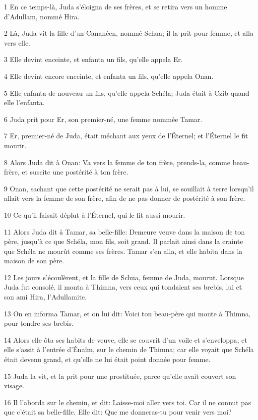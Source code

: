 \par 1 En ce temps-là, Juda s'éloigna de ses frères, et se retira vers un homme d'Adullam, nommé Hira.
\par 2 Là, Juda vit la fille d'un Cananéen, nommé Schua; il la prit pour femme, et alla vers elle.
\par 3 Elle devint enceinte, et enfanta un fils, qu'elle appela Er.
\par 4 Elle devint encore enceinte, et enfanta un fils, qu'elle appela Onan.
\par 5 Elle enfanta de nouveau un fils, qu'elle appela Schéla; Juda était à Czib quand elle l'enfanta.
\par 6 Juda prit pour Er, son premier-né, une femme nommée Tamar.
\par 7 Er, premier-né de Juda, était méchant aux yeux de l'Éternel; et l'Éternel le fit mourir.
\par 8 Alors Juda dit à Onan: Va vers la femme de ton frère, prends-la, comme beau-frère, et suscite une postérité à ton frère.
\par 9 Onan, sachant que cette postérité ne serait pas à lui, se souillait à terre lorsqu'il allait vers la femme de son frère, afin de ne pas donner de postérité à son frère.
\par 10 Ce qu'il faisait déplut à l'Éternel, qui le fit aussi mourir.
\par 11 Alors Juda dit à Tamar, sa belle-fille: Demeure veuve dans la maison de ton père, jusqu'à ce que Schéla, mon fils, soit grand. Il parlait ainsi dans la crainte que Schéla ne mourût comme ses frères. Tamar s'en alla, et elle habita dans la maison de son père.
\par 12 Les jours s'écoulèrent, et la fille de Schua, femme de Juda, mourut. Lorsque Juda fut consolé, il monta à Thimna, vers ceux qui tondaient ses brebis, lui et son ami Hira, l'Adullamite.
\par 13 On en informa Tamar, et on lui dit: Voici ton beau-père qui monte à Thimna, pour tondre ses brebis.
\par 14 Alors elle ôta ses habits de veuve, elle se couvrit d'un voile et s'enveloppa, et elle s'assit à l'entrée d'Énaïm, sur le chemin de Thimna; car elle voyait que Schéla était devenu grand, et qu'elle ne lui était point donnée pour femme.
\par 15 Juda la vit, et la prit pour une prostituée, parce qu'elle avait couvert son visage.
\par 16 Il l'aborda sur le chemin, et dit: Laisse-moi aller vers toi. Car il ne connut pas que c'était sa belle-fille. Elle dit: Que me donneras-tu pour venir vers moi?
